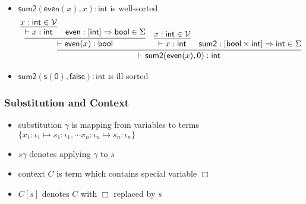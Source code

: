 \documentclass[12pt,aspectratio=169]{beamer}
\newcommand{\m}[1]{\mathsf{#1}}
\newcommand{\VV}{\mathcal{V}}
\begin{document}
\begin{frame}
    \begin{example}
        \begin{itemize}
        \item $\m{sum2}(\m{even}(x), x) : \m{int}$ is well-sorted
        {\small
            \begin{align*}
                \infer{\vdash \m{sum2}(\m{even}(x), \m{0}) : \m{int}}
                {\infer{\vdash \m{even}(x) : \m{bool}}
                    {\infer{\vdash x : \m{int}}{x : \m{int} \in \VV} & \m{even} : [\m{int}] \Rightarrow \m{bool} \in \Sigma}
                & \infer{\vdash x : \m{int}}{x : \m{int} \in \VV}
                & \m{sum2} : [\m{bool} \times \m{int}] \Rightarrow \m{int} \in \Sigma
                }
            \end{align*}
        }
        \item $\m{sum2}(\m{s}(\m{0}), \m{false}) : \m{int}$ is ill-sorted
        \end{itemize}
    \end{example}
\end{frame}

\begin{frame}
    \frametitle{Substitution and Context}
    \begin{definition}[substitution]
        \begin{itemize}
            \item \alert{substitution} $\gamma$ is mapping from variables to terms
        $\{x_1:\iota_1 \mapsto s_1 : \iota_1, \cdots x_n:\iota_n \mapsto s_n : \iota_n\}$
            \item $s\gamma$ denotes applying $\gamma$ to $s$
        \end{itemize}
    \end{definition}
    \begin{definition}[context]
        \begin{itemize}
            \item \alert{context} $C$ is term which contains special variable $\Box$
            \item $C[s]$ denotes $C$ with $\Box$ replaced by $s$
        \end{itemize}
    \end{definition}
\end{frame}
\end{document}
